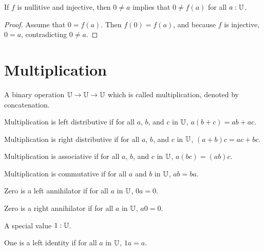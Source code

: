 \documentclass[../../math.tex]{subfiles}
\begin{document}
\begin{theorem} \label{homo_inj_zero}
    If $f$ is nullitive and injective, then $0 \neq a$ implies that $0 \neq
    f(a)$ for all $a : \mathbb{U}$.
\end{theorem}
\begin{proof}
    Assume that $0 = f(a)$.  Then $f(0) = f(a)$, and because $f$ is injective,
    $0 = a$, contradicting $0 \neq a$.
\end{proof}

\section{Multiplication}

\begin{class} \label{mult}
    A binary operation $\mathbb{U} \rightarrow \mathbb{U} \rightarrow \mathbb{U}$ which is called
    multiplication, denoted by concatenation.
\end{class}

\begin{class}
    Multiplication is left distributive if for all $a$, $b$, and $c$ in $\mathbb{U}$,
    $a(b + c) = ab + ac$.
\end{class}

\begin{class}
    Multiplication is right distributive if for all $a$, $b$, and $c$ in $\mathbb{U}$,
    $(a + b)c = ac + bc$.
\end{class}

\begin{class}
    Multiplication is associative if for all $a$, $b$, and $c$ in $\mathbb{U}$, $a(bc) =
    (ab)c$.
\end{class}

\begin{class}
    Multiplication is commutative if for all $a$ and $b$ in $\mathbb{U}$, $ab = ba$.
\end{class}

\begin{class}
    Zero is a left annihilator if for all $a$ in $\mathbb{U}$, $0a = 0$.
\end{class}

\begin{class}
    Zero is a right annihilator if for all $a$ in $\mathbb{U}$, $a0 = 0$.
\end{class}

\begin{class}
    A special value $1 : \mathbb{U}$.
\end{class}

\begin{class}
    One is a left identity if for all $a$ in $\mathbb{U}$, $1a = a$.
\end{class}
\end{document}
